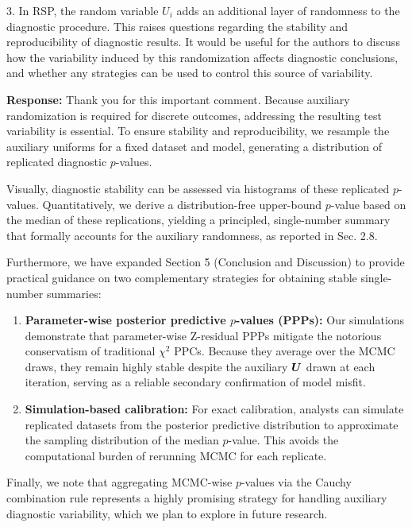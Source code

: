 \documentclass[11pt]{article}
\newcommand*{\mybox}[2]{%
  \par\medskip\noindent
  \colorbox{#1!30}{\parbox{.98\linewidth}{#2}}%
  \par\medskip
}
\begin{document}
\medskip
\mybox{gray}{3. In RSP, the random variable $U_i$ adds an additional layer of randomness to the diagnostic procedure. This raises questions regarding the stability and reproducibility of diagnostic results. It would be useful for the authors to discuss how the variability induced by this randomization affects diagnostic conclusions, and whether any strategies can be used to control this source of variability.}

\textbf{Response:} 
Thank you for this important comment. Because auxiliary randomization is required for discrete outcomes, addressing the resulting test variability is essential. To ensure stability and reproducibility, we resample the auxiliary uniforms for a fixed dataset and model, generating a distribution of replicated diagnostic $p$-values. 

Visually, diagnostic stability can be assessed via histograms of these replicated $p$-values. Quantitatively, we derive a distribution-free upper-bound $p$-value based on the median of these replications, yielding a principled, single-number summary that formally accounts for the auxiliary randomness, as reported in Sec. 2.8.

Furthermore, we have expanded Section 5 (Conclusion and Discussion) to provide practical guidance on two complementary strategies for obtaining stable single-number summaries:
\begin{enumerate}
    \item \textbf{Parameter-wise posterior predictive $p$-values (PPPs):} Our simulations demonstrate that parameter-wise Z-residual PPPs mitigate the notorious conservatism of traditional $\chi^2$ PPCs. Because they average over the MCMC draws, they remain highly stable despite the auxiliary $\bm{U}$ drawn at each iteration, serving as a reliable secondary confirmation of model misfit.
    \item \textbf{Simulation-based calibration:} For exact calibration, analysts can simulate replicated datasets from the posterior predictive distribution to approximate the sampling distribution of the median $p$-value. This avoids the computational burden of rerunning MCMC for each replicate.
\end{enumerate}
Finally, we note that aggregating MCMC-wise $p$-values via the Cauchy combination rule \citep{liu2020cauchy} represents a highly promising strategy for handling auxiliary diagnostic variability, which we plan to explore in future research.

\vspace{1em}
\end{document}
